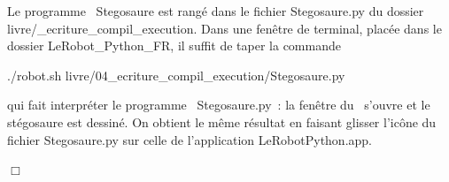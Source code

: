 \begin{corrige}{
Le programme \python\ {\idt Ste\-go\-sau\-re} est rangé dans le
fichier {\idt Stegosaure.py} du dossier {\idt livre/\_ecriture\_compil\_execution}.
Dans une fenêtre de terminal, placée dans le dossier {\idt LeRobot\_Python\_FR}, il suffit de 
taper la commande
\begin{center}
{\idt ./robot.sh livre/04\_ecriture\_compil\_execution/Stegosaure.py}
\end{center}
qui fait interpréter le programme \python\ {\idt Stegosaure.py}~: la fenêtre du \robot\ s'ouvre 
et le stégosaure est dessiné. On obtient le même résultat en faisant glisser l'icône du 
fichier {\idt Stegosaure.py} sur celle de l'application {\idt LeRobotPython.app}.

\noindent $\Box$}\end{corrige}

